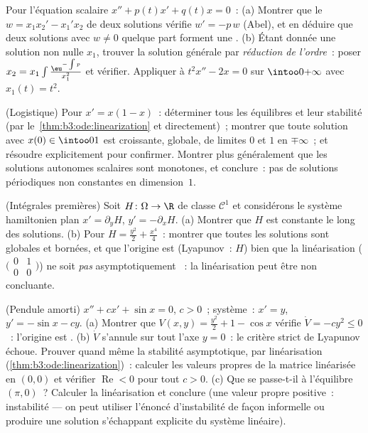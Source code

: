 \begin{exercise}[$\star\star$]\label{exo:b3:ode:5}
Pour l'équation scalaire $x'' + p(t)x' + q(t)x = 0$~:
(a) Montrer que le  $w = x_1x_2' - x_1'x_2$ de deux
solutions vérifie $w' = -p\,w$ (Abel), et en déduire que deux
solutions avec $w \neq 0$ quelque part forment une .
(b) Étant donnée une solution non nulle $x_1$, trouver la
solution générale par \emph{réduction de l'ordre}~: poser
$x_2 = x_1\int \frac{\eu^{-\int p}}{x_1^2}$ et vérifier.
Appliquer à $t^2x'' - 2x = 0$ sur $\intoo0{+\infty}$ avec
$x_1(t) = t^2$.
\end{exercise}

\begin{exercise}[$\star\star$]\label{exo:b3:ode:6}
(Logistique) Pour $x' = x(1 - x)$~: déterminer tous les
équilibres et leur stabilité (par
le~\cref{thm:b3:ode:linearization} et directement)~; montrer
que toute solution avec $x(0) \in \intoo01$ est croissante,
globale, de limites $0$ et $1$ en $\mp\infty$~; et résoudre
explicitement pour confirmer. Montrer plus généralement que
les solutions autonomes scalaires sont monotones, et
conclure~: pas de solutions périodiques non constantes en
dimension~$1$.
\end{exercise}

\begin{exercise}[$\star\star$]\label{exo:b3:ode:7}
(Intégrales premières) Soit $H \colon \Omega \to \R$ de
classe $\mathcal C^1$ et considérons le système hamiltonien
plan $x' = \partial_yH$, $y' = -\partial_xH$.
(a) Montrer que $H$ est constante le long des solutions.
(b) Pour $H = \frac{y^2}2 + \frac{x^4}4$~: montrer que toutes
les solutions sont globales et bornées, et que l'origine est
 (Lyapunov~: $H$) bien que la linéarisation
($\bigl(\begin{smallmatrix}0&1\\0&0\end{smallmatrix}\bigr)$)
ne soit \emph{pas} asymptotiquement ~: la linéarisation
peut être non concluante.
\end{exercise}

\begin{exercise}[$\star\star\star$]\label{exo:b3:ode:8}
(Pendule amorti) $x'' + cx' + \sin x = 0$, $c > 0$~; système~:
$x' = y$, $y' = -\sin x - cy$.
(a) Montrer que $V(x, y) = \frac{y^2}2 + 1 - \cos x$ vérifie
$\dot V = -cy^2 \leq 0$~: l'origine est .
(b) $\dot V$ s'annule sur tout l'axe $y = 0$~: le critère
strict de Lyapunov échoue. Prouver quand même la stabilité
asymptotique, par linéarisation
(\cref{thm:b3:ode:linearization})~: calculer les valeurs
propres de la matrice linéarisée en $(0,0)$ et vérifier
$\operatorname{Re} < 0$ pour tout $c > 0$.
(c) Que se passe-t-il à l'équilibre $(\pi, 0)$~? Calculer la
linéarisation et conclure (une valeur propre positive~:
instabilité --- on peut utiliser l'énoncé d'instabilité de
façon informelle ou produire une solution s'échappant
explicite du système linéaire).
\end{exercise}

